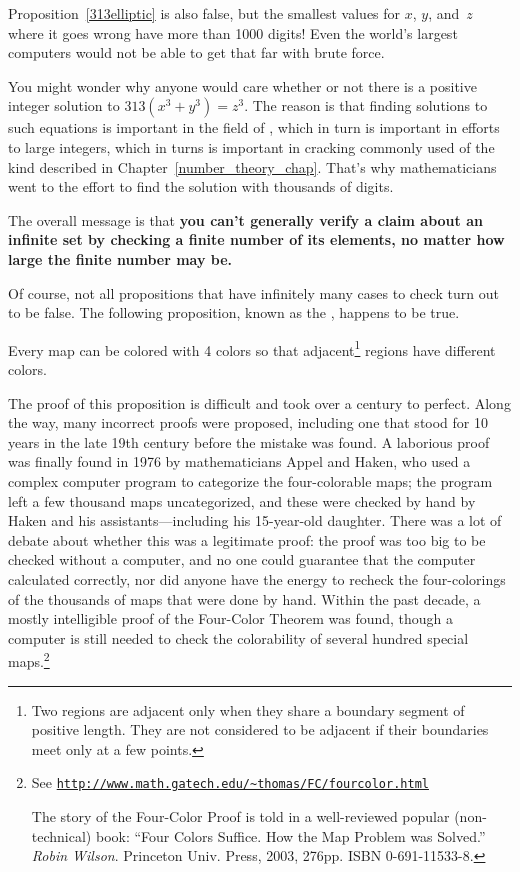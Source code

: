 Proposition~\ref{313elliptic} is also false, but the smallest values
for $x$, $y$, and~$z$ where it goes wrong have more than 1000 digits!
Even the world's largest computers would not be able to get that far
with brute force.

You might wonder why anyone would care whether or not there is a
positive integer solution to $313 (x^3 + y^3) = z^3$.  The reason is
that finding solutions to such equations is important in the field of
, which in turn is important in efforts to
 large integers, which in turns is important in cracking
commonly used  of the kind described in
Chapter~\ref{number_theory_chap}.  That's why mathematicians went to
the effort to find the solution with thousands of digits.

The overall message is that \textbf{you can't generally verify a claim
  about an infinite set by checking a finite number of its elements,
  no matter how large the finite number may be.}

Of course, not all propositions that have infinitely many cases to
check turn out to be false.  The following proposition, known as the
, happens to be true.
\begin{proposition}\label{4colorprop}
Every map can be colored with 4 colors so that adjacent\footnote{Two
  regions are adjacent only when they share a boundary segment of
  positive length.  They are not considered to be adjacent if their
  boundaries meet only at a few points.} regions have different
colors.
\end{proposition}
The proof of this proposition is difficult and took over a century to
perfect.  Along the way, many incorrect proofs were proposed,
including one that stood for 10 years in the late 19th century before
the mistake was found.  A laborious proof was finally found
in 1976 by mathematicians Appel and Haken, who used a complex computer
program to categorize the four-colorable maps; the program left a few
thousand maps uncategorized, and these were checked by hand by Haken
and his assistants---including his 15-year-old daughter.  There was a
lot of debate about whether this was a legitimate proof: the proof was
too big to be checked without a computer, and no one could guarantee
that the computer calculated correctly, nor did anyone have the energy
to recheck the four-colorings of the thousands of maps that were done by
hand.  Within the past decade, a mostly intelligible proof of the
Four-Color Theorem was found, though a computer is still needed to
check the colorability of several hundred special maps.\footnote{See
\href{http://www.math.gatech.edu/~thomas/FC/fourcolor.html}
{\texttt{http://www.math.gatech.edu/\~{}thomas/FC/fourcolor.html}}

The story of the Four-Color Proof is told in a well-reviewed
  popular (non-technical) book: ``Four Colors Suffice.  How the Map
  Problem was Solved.'' \emph{Robin Wilson}.  Princeton Univ. Press, 2003,
  276pp. ISBN 0-691-11533-8.}

